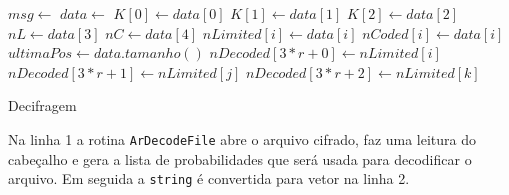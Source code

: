 \begin{algorithm}[t]
\begin{algorithmic}[1]
\footnotesize
    \vspace{0.2em}
    \State $msg \gets$ 
    \vspace{0.5em}
    \State $data \gets$ 
    \vspace{0.5em}
    \State $K[0] \gets data[0]$
    \State $K[1] \gets data[1]$
    \State $K[2] \gets data[2]$
    \vspace{0.5em}
    \State $nL \gets data[3]$
    \vspace{0.5em}
    \State $nC \gets data[4]$
    \vspace{0.5em}
        \vspace{0.2em}
        \State $nLimited[i] \gets data[i]$
    \EndFor
    \vspace{0.5em}
        \vspace{0.2em}
        \State $nCoded[i] \gets data[i]$
    \EndFor
    \vspace{0.5em}
    \State $ultimaPos \gets data.tamanho()$
        \vspace{0.2em}
            \vspace{0.2em}
                \vspace{0.2em}
                    \vspace{0.2em}
                        \vspace{0.2em}
                        \State $nDecoded[3*r+0] \gets nLimited[i]$
                        \State $nDecoded[3*r+1] \gets nLimited[j]$
                        \State $nDecoded[3*r+2] \gets nLimited[k]$
                    \EndIf
                \EndFor
            \EndFor
        \EndFor
    \EndFor
    \vspace{0.5em}
    \State {}
\end{algorithmic}
\caption{Decifragem}
\label{algorithm: gmprd}
\end{algorithm}

Na linha 1 a rotina \texttt{ArDecodeFile} abre o arquivo cifrado, faz uma leitura do cabeçalho e gera a lista de probabilidades que será usada para decodificar o arquivo. Em seguida a \texttt{string} é convertida para vetor na linha 2.

